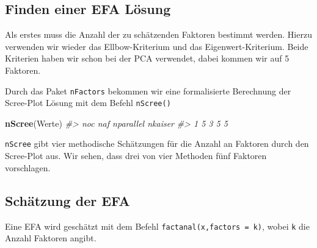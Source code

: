 \documentclass[12pt,ngerman,]{book}
\makeatletter
\newenvironment{Shaded}{\begin{snugshade}}{\end{snugshade}}
\newcommand{\KeywordTok}[1]{\textcolor[rgb]{0.13,0.29,0.53}{\textbf{{#1}}}}
\newcommand{\CommentTok}[1]{\textcolor[rgb]{0.56,0.35,0.01}{\textit{{#1}}}}
\newcommand{\NormalTok}[1]{{#1}}
\newenvironment{kframe}{%
\medskip{}
\setlength{\fboxsep}{.8em}
 \def\at@end@of@kframe{}%
 \ifinner\ifhmode%
  \def\at@end@of@kframe{\end{minipage}}%
  \begin{minipage}{\columnwidth}%
 \fi\fi%
 \def\FrameCommand##1{\hskip\@totalleftmargin \hskip-\fboxsep
 \colorbox{shadecolor}{##1}\hskip-\fboxsep
     \hskip-\linewidth \hskip-\@totalleftmargin \hskip\columnwidth}%
 \MakeFramed {\advance\hsize-\width
   \@totalleftmargin\z@ \linewidth\hsize
   \@setminipage}}%
 {\par\unskip\endMakeFramed%
 \at@end@of@kframe}
\renewenvironment{Shaded}{\begin{kframe}}{\end{kframe}}
\makeatother
\begin{document}
\subsection{Finden einer EFA Lösung}\label{finden-einer-efa-losung}

Als erstes muss die Anzahl der zu schätzenden Faktoren bestimmt werden.
Hierzu verwenden wir wieder das Ellbow-Kriterium und das
Eigenwert-Kriterium. Beide Kriterien haben wir schon bei der PCA
verwendet, dabei kommen wir auf 5 Faktoren.

Durch das Paket \texttt{nFactors} bekommen wir eine formalisierte
Berechnung der Scree-Plot Lösung mit dem Befehl \texttt{nScree()}

\begin{Shaded}
\begin{Highlighting}[]
\KeywordTok{nScree}\NormalTok{(Werte)}
\CommentTok{#>   noc naf nparallel nkaiser}
\CommentTok{#> 1   5   3         5       5}
\end{Highlighting}
\end{Shaded}

\texttt{nScree} gibt vier methodische Schätzungen für die Anzahl an
Faktoren durch den Scree-Plot aus. Wir sehen, dass drei von vier
Methoden fünf Faktoren vorschlagen.

\subsection{Schätzung der EFA}\label{schatzung-der-efa}

Eine EFA wird geschätzt mit dem Befehl
\texttt{factanal(x,factors\ =\ k)}, wobei \texttt{k} die Anzahl Faktoren
angibt.
\end{document}
